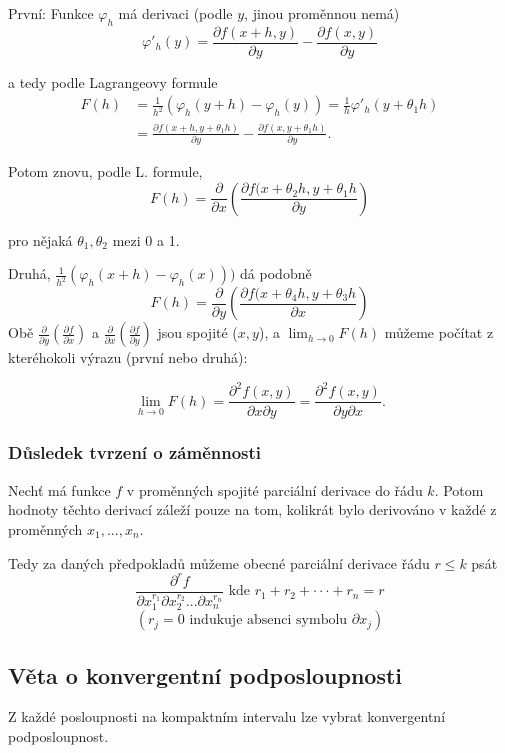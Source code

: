 \documentclass[../main.tex]{subfiles}
\begin{document}
První: Funkce $\varphi_h$ má derivaci (podle $y$, jinou proměnnou nemá)
\[\varphi'_h(y)=\frac{\partial f(x+h,y)}{\partial y}-\frac{\partial f(x,y)}{\partial y}\]

a tedy podle Lagrangeovy formule
\begin{align*}
    F(h) & = \frac{1}{h^2}(\varphi_h(y+h)-\varphi_h(y)) = \frac{1}{h}\varphi'_h(y+\theta_1h)\\
    & = \frac{\partial f(x+h,y+\theta_1h)}{\partial y} -\frac{\partial f(x,y+\theta_1h)}{\partial y}.
\end{align*}

Potom znovu, podle L. formule,
\[F(h) = \frac{\partial }{\partial x}\left(\frac{\partial f(x+\theta_2h,y+\theta_1h}{\partial y}\right)\]

pro nějaká $\theta_1,\theta_2$ mezi 0 a 1.

Druhá, $\frac{1}{h^2}(\varphi_h(x+h) - \varphi_h(x)))$ dá podobně
\[F(h) = \frac{\partial }{\partial y}\left(\frac{\partial f(x+\theta_4h,y + \theta_3h}{\partial x}\right)\]
Obě $\frac{\partial }{\partial y}(\frac{\partial f}{\partial x})$ a $\frac{\partial }{\partial x}(\frac{\partial f}{\partial y})$ jsou spojité ($x,y$), a $\lim_{h\rightarrow 0} F(h)$ můžeme počítat z kteréhokoli výrazu (první nebo druhá):

\[\lim_{h\rightarrow 0}F(h) = \frac{\partial ^2 f(x,y)}{\partial x \partial y} 
                            = \frac{\partial ^2 f(x,y)}{\partial y \partial x}.\]
\subsubsection{Důsledek tvrzení o záměnnosti}
\hspace{1.2mm}
Nechť má funkce $f$ v proměnných spojité parciální derivace do řádu $k$. Potom hodnoty těchto derivací
záleží pouze na tom, kolikrát bylo derivováno v každé z proměnných $x_1, ... , x_n$.

\noindent
\hspace{1.2mm}
Tedy za daných předpokladů můžeme obecné parciální derivace řádu $r \leq k$ psát
\[\frac{\partial ^r f}{\partial x^{r_1}_1 \partial x^{r_2}_2 ... \partial x_n^{r_n}} \text{ kde } r_1 + r_2 + \cdot \cdot \cdot + r_n = r \]
\[(r_j = 0 \text{ indukuje absenci symbolu } \partial x_j)\]

\subsection{Věta o konvergentní podposloupnosti}
\hspace{1.2mm}
\noindent
Z každé posloupnosti na kompaktním intervalu lze vybrat konvergentní podposloupnost.
\end{document}
